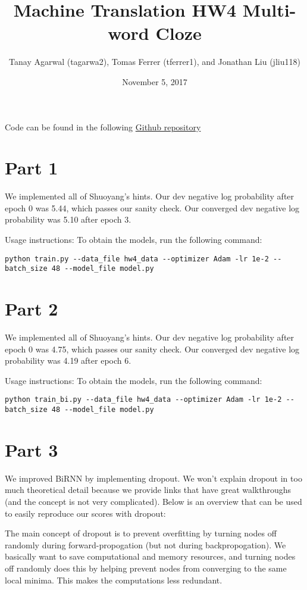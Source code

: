\documentclass{article}
\title{Machine Translation HW4 Multi-word Cloze}
\author{Tanay Agarwal (tagarwa2), Tomas Ferrer (tferrer1), and Jonathan Liu (jliu118)}
\date{November 5, 2017}
\begin{document}
\maketitle

Code can be found in the following \href{https://github.com/tferrer1/mt-clauze}{Github repository}

\section{Part 1}

We implemented all of Shuoyang's hints. Our dev negative log probability after epoch 0 was 5.44, which passes our sanity check. Our converged dev negative log probability was 5.10 after epoch 3.

Usage instructions:
To obtain the models, run the following command:
\begin{verbatim}
python train.py --data_file hw4_data --optimizer Adam -lr 1e-2 --batch_size 48 --model_file model.py
\end{verbatim}

\section{Part 2}

We implemented all of Shuoyang's hints. Our dev negative log probability after epoch 0 was 4.75, which passes our sanity check. Our converged dev negative log probability was 4.19 after epoch 6.

Usage instructions:
To obtain the models, run the following command:
\begin{verbatim}
python train_bi.py --data_file hw4_data --optimizer Adam -lr 1e-2 --batch_size 48 --model_file model.py
\end{verbatim}

\section{Part 3}

We improved BiRNN by implementing dropout. We won't explain dropout in too much theoretical detail because we provide links that have great walkthroughs (and the concept is not very complicated). Below is an overview that can be used to easily reproduce our scores with dropout:

The main concept of dropout is to prevent overfitting by turning nodes off randomly during forward-propogation (but not during backpropogation). We basically want to save computational and memory resources, and turning nodes off randomly does this by helping prevent nodes from converging to the same local minima. This makes the computations less redundant.
\end{document}

